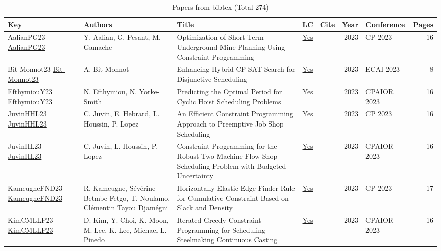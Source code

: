 {\scriptsize
\begin{longtable}{p{3cm}p{6cm}p{7cm}rrrp{3cm}r}
\caption{Papers from bibtex (Total 274)}\\ \toprule
Key & Authors & Title & LC & Cite & Year & Conference & Pages \\ \midrule\endhead
\bottomrule
\endfoot
AalianPG23 \href{https://doi.org/10.4230/LIPIcs.CP.2023.6}{AalianPG23} & Y. Aalian, G. Pesant, M. Gamache & Optimization of Short-Term Underground Mine Planning Using Constraint Programming & \href{papers/AalianPG23.pdf}{Yes} & \cite{AalianPG23} & 2023 & CP 2023 & 16\\
Bit-Monnot23 \href{https://doi.org/10.3233/FAIA230278}{Bit-Monnot23} & A. Bit{-}Monnot & Enhancing Hybrid {CP-SAT} Search for Disjunctive Scheduling & \href{papers/Bit-Monnot23.pdf}{Yes} & \cite{Bit-Monnot23} & 2023 & ECAI 2023 & 8\\
EfthymiouY23 \href{https://doi.org/10.1007/978-3-031-33271-5\_16}{EfthymiouY23} & N. Efthymiou, N. Yorke{-}Smith & Predicting the Optimal Period for Cyclic Hoist Scheduling Problems & \href{papers/EfthymiouY23.pdf}{Yes} & \cite{EfthymiouY23} & 2023 & CPAIOR 2023 & 16\\
JuvinHHL23 \href{https://doi.org/10.4230/LIPIcs.CP.2023.19}{JuvinHHL23} & C. Juvin, E. Hebrard, L. Houssin, P. Lopez & An Efficient Constraint Programming Approach to Preemptive Job Shop Scheduling & \href{papers/JuvinHHL23.pdf}{Yes} & \cite{JuvinHHL23} & 2023 & CP 2023 & 16\\
JuvinHL23 \href{https://doi.org/10.1007/978-3-031-33271-5\_23}{JuvinHL23} & C. Juvin, L. Houssin, P. Lopez & Constraint Programming for the Robust Two-Machine Flow-Shop Scheduling Problem with Budgeted Uncertainty & \href{papers/JuvinHL23.pdf}{Yes} & \cite{JuvinHL23} & 2023 & CPAIOR 2023 & 16\\
KameugneFND23 \href{https://doi.org/10.4230/LIPIcs.CP.2023.20}{KameugneFND23} & R. Kameugne, S{\'{e}}v{\'{e}}rine Betmbe Fetgo, T. Noulamo, Cl{\'{e}}mentin Tayou Djam{\'{e}}gni & Horizontally Elastic Edge Finder Rule for Cumulative Constraint Based on Slack and Density & \href{papers/KameugneFND23.pdf}{Yes} & \cite{KameugneFND23} & 2023 & CP 2023 & 17\\
KimCMLLP23 \href{https://doi.org/10.1007/978-3-031-33271-5\_31}{KimCMLLP23} & D. Kim, Y. Choi, K. Moon, M. Lee, K. Lee, Michael L. Pinedo & Iterated Greedy Constraint Programming for Scheduling Steelmaking Continuous Casting & \href{papers/KimCMLLP23.pdf}{Yes} & \cite{KimCMLLP23} & 2023 & CPAIOR 2023 & 16\\

\end{longtable}}

